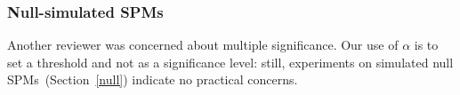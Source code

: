 \subsubsection{Null-simulated SPMs} Another reviewer was concerned
about multiple significance. Our use of $\alpha$ is to set a
threshold and not as a significance level: still, experiments on
simulated null SPMs~(Section~\ref{null}) indicate no practical
concerns.%


\begin{comment}
\subsection{Experimental Setup: Activation during Finger tapping experiments}
Finger tapping experiment for the right hand consist in a $128\times 128 \times 22 \times 12$ with 12 replicates.  To compare consistency on the overlap measure, we reported the generalized overlap of the firsts sixth replicates, similar as \citep{maitra10}. Figure \ref{fig:Overlapmatrix} we display the overlap matrix for each hand using both AR-FAST and AM-FAST. The generalized overlap for the right hand $\ddot{\omega}_R = 0.1906$ and for the left hand $\ddot{\omega}_L = 0.2597$ Supplemental material contained the results for all 12 replicates for the right hand and results for 10 replicates of the left hand. Due some bogus in the left hand recopilation, replicates 8 and 11 were removed.


\section{Results}

\subsection{Results: Hoffman Phantom}


Figure~\ref{fig:sim.activ} provides activation maps detected using AM-FAST (with $\alpha = 0.025$), CT and TP11 for each case of Figure~\ref{fig:sim.phant}. AR-FAST results were essentially
indistinguishable from AM-FAST and so are not displayed. It is
encouraging to note that AM-FAST  visually tracks very closely
to the activation regions of Figure~\ref{fig:Hoff}. Both CT and TP11
also identify the true regions as activated but they also identify
several other pixels as activated, with more false positives detected
at lower CNR levels. 

\begin{figure*}[!h]
\begin{center}
\texttt{[image: figures/Jaccard\_IndexAR0123]}
\caption[JaccardIndex]{Jaccard Index perfomance for each of the algorithms}
  \label{fig:Jaccard2}
\end{center}
\end{figure*}


\end{comment}
